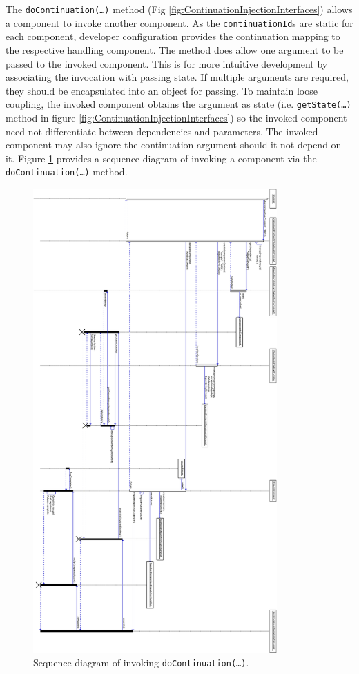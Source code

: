 \documentclass[prodmode]{style/acmlarge}
\begin{document}
The \texttt{doContinuation(\ldots)} method (Fig
\ref{fig:ContinuationInjectionInterfaces}) allows a component to invoke another
component.  As the \texttt{continu\-ationId}s are static for each component,
developer configuration provides the continuation mapping to the respective handling
component.  The method does allow one argument to be passed to the invoked
component.  This is for more intuitive development by associating the invocation
with passing state.  If multiple arguments are required, they should be
encapsulated into an object for passing.  To maintain loose coupling, the
invoked component obtains the argument as state (i.e. \texttt{getState(\ldots)}
method in figure \ref{fig:ContinuationInjectionInterfaces}) so the invoked
component need not differentiate between dependencies and parameters.  The
invoked component may also ignore the continuation argument should it not depend
on it.  Figure \ref{fig:DoContinuationSequenceDiagram} provides a sequence
diagram of invoking a component via the \texttt{doContinuation(\ldots)} method.
  
\begin{figure}[!t]
\centering
\includegraphics[height=7in]{DoContinuationSequenceDiagram}
\caption{Sequence diagram of invoking \texttt{doContinuation(\ldots)}.}
\label{fig:DoContinuationSequenceDiagram}
\end{figure}
 
\end{document}
